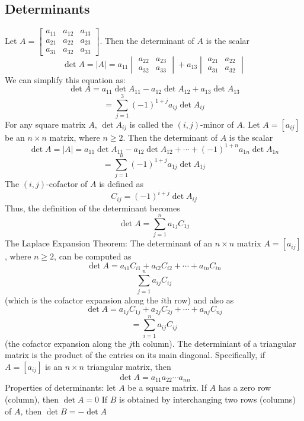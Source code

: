 \documentclass{article}
\begin{document}
    \subsection{Determinants}
    \begin{outline}
        \1 Let \(A = \begin{bmatrix}
            a_{11} & a_{12} & a_{13} \\ a_{21} & a_{22} & a_{23} \\ a_{31} & a_{32} & a_{33}
        \end{bmatrix}\). Then the determinant of $A$ is the scalar \[\det A = |A| = a_{11}\begin{vmatrix}
            a_{22} & a_{23} \\ a_{32} & a_{33}
        \end{vmatrix}+a_{13}\begin{vmatrix}
            a_{21} & a_{22} \\ a_{31} & a_{32}
        \end{vmatrix}\]
        \1 We can simplify this equation as: \[\det A=a_{11}\det A_{11} - a_{12}\det A_{12}+a_{13}\det A_{13}\]\[=\sum^3_{j=1}(-1)^{1+j}a_{ij}\det A_{ij}\]
        \1 For any square matrix $A$, \(\det A_{ij}\) is called the \((i,j)\)-minor of $A$. 
        \1 Let \(A=[a_{ij}]\) be an \(n\times n\) matrix, where \(n\geq 2\). Then the determinant of $A$ is the scalar \[\det A=|A|=a_{11}\det A_{11}-a_{12}\det A_{12}+\cdots+(-1)^{1+n}a_{1n}\det A_{1n}\]\[=\sum^n_{j=1}(-1)^{1+j}a_{1j}\det A_{1j}\]
        \1 The \((i,j)\)-cofactor of $A$ is defined as \[C_{ij}=(-1)^{i+j}\det A_{ij}\]
        \1 Thus, the definition of the determinant becomes \[\det A=\sum^n_{j=1}a_{1j}C_{1j}\]
        \1 The Laplace Expansion Theorem: The determinant of an \(n\times n\) matrix \(A=[a_{ij}]\), where \(n\geq 2\), can be computed as \[\det A=a_{i1}C_{i1}+a_{i2}C_{i2}+\cdots+a_{in}C_{in}\]\[\sum^n_{j=1}a_{ij}C_{ij}\] (which is the cofactor expansion along the $i$th row) and also as \[\det A=a_{1j}C_{1j}+a_{2j}C_{2j}+\cdots+a_{nj}C_{nj}\]\[=\sum^n_{i=1}a_{ij}C_{ij}\] (the cofactor expansion along the $j$th column). 
        \1 The determiniant of a triangular matrix is the product of the entries on its main diagonal. Specifically, if \(A=[a_{ij}]\) is an \(n\times n\) triangular matrix, then \[\det A=a_{11}a_{22}\cdots a_{nn}\]
        \1 Properties of determinants: let \(A\) be a square matrix. 
            \2 If $A$ has a zero row (column), then \(\det A=0\)
            \2 If $B$ is obtained by interchanging two rows (columns) of $A$, then \(\det B=-\det A\)

\end{outline}
\end{document}
